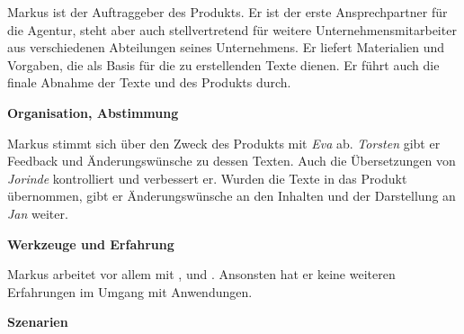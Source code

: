\begin{multicols}{2}

\begin{center}
\end{center}


Markus ist der Auftraggeber des Produkts. Er ist der erste Ansprechpartner für die Agentur, steht aber auch stellvertretend für weitere Unternehmensmitarbeiter aus verschiedenen Abteilungen seines Unternehmens. Er liefert Materialien und Vorgaben, die als Basis für die zu erstellenden Texte dienen. Er führt auch die finale Abnahme der Texte und des Produkts durch.

\textbf{Organisation, Abstimmung}

Markus stimmt sich über den Zweck des Produkts mit \emph{Eva} ab. \emph{Torsten} gibt er Feedback und Änderungswünsche zu dessen Texten. Auch die Übersetzungen von \emph{Jorinde} kontrolliert und verbessert er. Wurden die Texte in das Produkt übernommen, gibt er Änderungswünsche an den Inhalten und der Darstellung an \emph{Jan} weiter.

\textbf{Werkzeuge und Erfahrung}

Markus arbeitet vor allem mit ,  und . Ansonsten hat er keine weiteren Erfahrungen im Umgang mit Anwendungen.

\columnbreak

\textbf{Szenarien}


\end{multicols}
